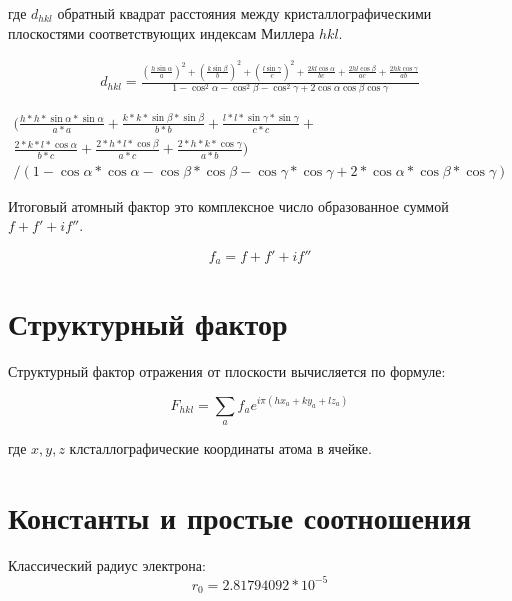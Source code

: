 \documentclass[12pt,a4paper,draft]{article}
\begin{document}
где $ d_{hkl} $ обратный квадрат расстояния между кристаллографическими плоскостями соответствующих индексам Миллера $hkl$.

\begin{multline}
    d_{hkl} = \frac{ \left( \frac{h \sin \alpha}{a} \right)^2 +
    \left( \frac{k \sin \beta}{b} \right)^2 +
    \left( \frac{l \sin \gamma}{c} \right)^2 +
    \frac{2kl \cos \alpha}{bc} +
    \frac{2hl \cos \beta}{ac} +
    \frac{2hk \cos \gamma}{ab} }
    {1 - \cos^2 \alpha - \cos^2 \beta -
    \cos^2 \gamma + 2 \cos \alpha \cos \beta \cos \gamma}
\end{multline}

\begin{multline}
    ( \frac{h * h * \sin \alpha * \sin \alpha}{a * a} +
    \frac{k * k * \sin \beta * \sin \beta}{b * b} +
    \frac{l * l * \sin \gamma * \sin \gamma}{c * c} + \\
    \frac{2 * k * l * \cos \alpha}{b * c} +
    \frac{2 * h * l * \cos \beta}{a * c} +
    \frac{2 * h * k * \cos \gamma}{a * b} ) \\ /
        (1 - \cos \alpha * \cos \alpha - \cos \beta * \cos \beta -
        \cos \gamma * \cos \gamma + 2 * \cos \alpha * \cos \beta * \cos \gamma)
\end{multline}

Итоговый атомный фактор это комплексное число образованное суммой $ f + f' +if'' $.

\begin{equation}
    f_a = f + f' + if''
\end{equation}

\section{Структурный фактор}

Структурный фактор отражения от плоскости вычисляется по формуле:

\begin{equation}
    F_{hkl} = \sum_{a} f_a e^{i \pi (hx_a + ky_a + lz_a)}
\end{equation}

где $ x, y, z $ клсталлографические координаты атома в ячейке.

\section{Константы и простые соотношения}

Классический радиус электрона:
\begin{equation}
    r_0 = 2.81794092 * 10^{-5}
\end{equation}
\end{document}
